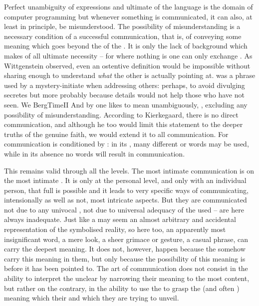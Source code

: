 Perfect unambiguity of expressions and ultimate  of the language
is the domain of computer programming but whenever something is communicated, it
can also, at least in principle, be misunderstood. The possibility of
misunderstanding is a necessary condition of a successful communication, that is,
of conveying some meaning which goes beyond the  of the .
It is only the lack of  background which makes  of all
 ultimate necessity -- for where nothing is  one can only
exchange . As Wittgenstein observed, even an ostentive definition
would be impossible without sharing enough to understand {\em what} the other is
actually pointing at.   was a
phrase used by a mystery-initiate when addressing others: perhaps, to avoid
divulging secretes but more probably because details would not help those who
have not seen.  We \citet{need not be surprised if only those ideas which least
  belong to us can be adequately expressed in words.}{BergTime}{II}
And by  one likes to mean unambiguously, ,
excluding any possibility of misunderstanding.  According to Kierkegaard, there
is no direct communication, and although he too would limit this statement to
the deeper truths of the genuine faith, we would extend it to all communication.
For communication is conditioned by : in its , many
different  or words may be used, while in its absence no words will
result in communication.

This remains valid through all the levels. The most intimate communication is
 on the most intimate .  It is only at the personal
level, and only with an individual person, that full  is possible
and it leads to very specific ways of communicating, intensionally as well as
not, most intricate aspects.  But they are communicated not due to any univocal
, not due to universal adequacy of the used  --
 are here always inadequate.  Just like a  may seem an
almost arbitrary and accidental representation of the symbolised reality, so
here too, an apparently most insignificant word, a mere look, a sheer grimace or
gesture, a casual phrase, can  carry the deepest meaning. It does
not, however, happen because the  somehow carry this meaning in them,
but only because the possibility of this meaning is  before it has
been pointed to. The art of communication does not consist in the ability to
interpret the unclear  by narrowing their meaning to the most
 content, but rather on the contrary, in the ability to use the
 to grasp the  (and often )
meaning which  their  and which they are trying to
unveil.

